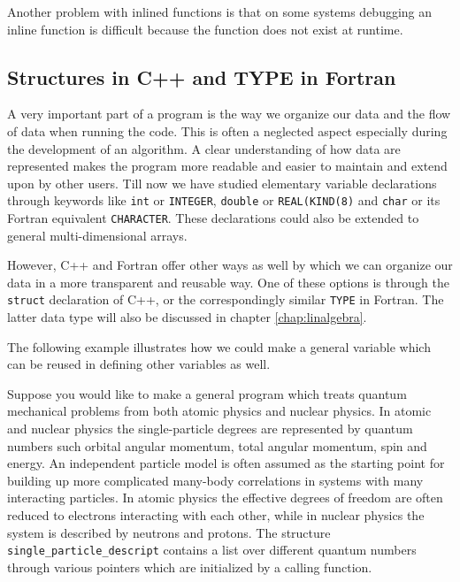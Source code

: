 Another problem with inlined functions is that on some systems debugging an inline 
function is difficult because the function does not exist at runtime.



\subsection{Structures  in  C++ and TYPE in Fortran }

A very important part  of a program is the way we organize
our data and the flow of data when running the code. 
This is  often a neglected aspect especially during the development of an algorithm.
A clear understanding of how data are represented makes the program more 
readable and easier to maintain and extend upon by other users. 
Till now we have studied elementary variable declarations through keywords
like \verb?int? or \verb?INTEGER?, 
\verb?double? or \verb?REAL(KIND(8)? and \verb?char? or its
Fortran  equivalent \verb?CHARACTER?. 
These declarations could also be extended to general multi-dimensional arrays.

However, 
C++ and Fortran  offer other ways as well by which we can organize
our data in  a more transparent and reusable way. One of these 
options is through the \verb?struct? declaration of C++, 
or the correspondingly similar \verb?TYPE? in Fortran. The latter data type 
will also be discussed in chapter \ref{chap:linalgebra}.

The following example illustrates how we could make a general variable
which can be reused in defining other variables as well.

Suppose you would like to make a general program which treats quantum
mechanical problems from both atomic physics and nuclear physics. 
In atomic and nuclear physics the single-particle degrees are represented
by quantum numbers such orbital angular momentum, total angular momentum,
spin and energy. An independent particle model is often assumed as the starting
point for building up more complicated many-body correlations in systems
with many interacting particles. In atomic physics the effective 
degrees of freedom are often reduced to electrons interacting with each other, while in nuclear physics the system is described by neutrons and protons. 
The structure 
\verb? single_particle_descript? contains a list over different quantum 
numbers through various pointers which are initialized by a calling function.


